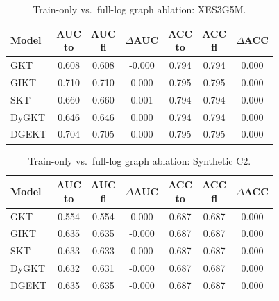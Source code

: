\begin{table}[t]
\centering
\scriptsize
\setlength{\tabcolsep}{2pt}
\caption{Train-only vs.\ full-log graph ablation: XES3G5M.}
\label{tab:graph-ablation-xes3g5m}
\begin{tabular}{@{} >{\RaggedRight\arraybackslash}p{12mm} *{6}{c} @{}}
\toprule
Model & \makecell{AUC\\to} & \makecell{AUC\\fl} & $\Delta$AUC & \makecell{ACC\\to} & \makecell{ACC\\fl} & $\Delta$ACC \\
\midrule
GKT & 0.608 & 0.608 & -0.000 & 0.794 & 0.794 & 0.000 \\
GIKT & 0.710 & 0.710 & 0.000 & 0.795 & 0.795 & 0.000 \\
SKT & 0.660 & 0.660 & 0.001 & 0.794 & 0.794 & 0.000 \\
DyGKT & 0.646 & 0.646 & 0.000 & 0.794 & 0.794 & 0.000 \\
DGEKT & 0.704 & 0.705 & 0.000 & 0.795 & 0.795 & 0.000 \\
\bottomrule
\end{tabular}
\end{table}

\begin{table}[t]
\centering
\scriptsize
\setlength{\tabcolsep}{2pt}
\caption{Train-only vs.\ full-log graph ablation: Synthetic C2.}
\label{tab:graph-ablation-synthetic-c2}
\begin{tabular}{@{} >{\RaggedRight\arraybackslash}p{12mm} *{6}{c} @{}}
\toprule
Model & \makecell{AUC\\to} & \makecell{AUC\\fl} & $\Delta$AUC & \makecell{ACC\\to} & \makecell{ACC\\fl} & $\Delta$ACC \\
\midrule
GKT & 0.554 & 0.554 & 0.000 & 0.687 & 0.687 & 0.000 \\
GIKT & 0.635 & 0.635 & -0.000 & 0.687 & 0.687 & 0.000 \\
SKT & 0.633 & 0.633 & 0.000 & 0.687 & 0.687 & 0.000 \\
DyGKT & 0.632 & 0.631 & -0.000 & 0.687 & 0.687 & 0.000 \\
DGEKT & 0.635 & 0.635 & -0.000 & 0.687 & 0.687 & 0.000 \\
\bottomrule
\end{tabular}
\end{table}

